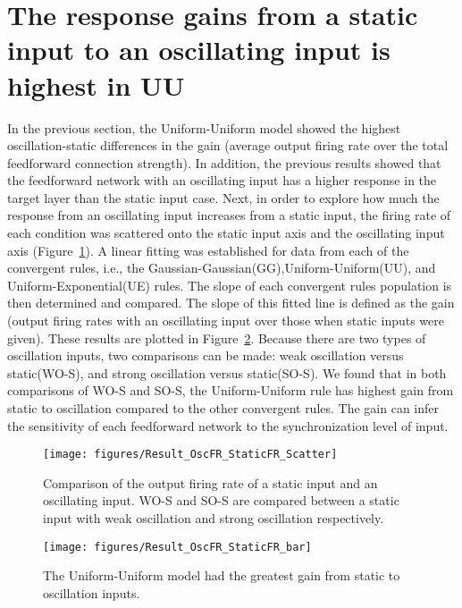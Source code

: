 \section[Gain of Response by Input Types]{The response gains from a static input to an oscillating input is highest in UU}
 In the previous section, the Uniform-Uniform model showed the highest oscillation-static differences in the gain (average output firing rate over the total feedforward connection strength). In addition, the previous results showed that the feedforward network with an oscillating input has a higher response in the target layer than the static input case. 
Next, in order to explore how much the response from an oscillating input increases from a static input, the firing rate of each condition was scattered onto the static input axis and the oscillating input axis (Figure~\ref{fig:ResFunDiffOscS}). A linear fitting was established for data from each of the convergent rules, i.e., the Gaussian-Gaussian(GG),Uniform-Uniform(UU), and Uniform-Exponential(UE) rules. The slope of each convergent rules population is then determined and compared. The slope of this fitted line is defined as the gain (output firing rates with an oscillating input over those when static inputs were given). These results are plotted in Figure~\ref{fig:ResFunDiffOscS_hp}. Because there are two types of oscillation inputs, two comparisons can be made: weak oscillation versus static(WO-S), and strong oscillation versus static(SO-S). We found that in both comparisons of WO-S and SO-S, the Uniform-Uniform rule has highest gain from static to oscillation compared to the other convergent rules. The gain can infer the sensitivity of each feedforward network to the synchronization level of input. 



\begin{figure}[!h]
	\centering
	\texttt{[image: figures/Result\_OscFR\_StaticFR\_Scatter]}
	\caption[Comparison of the output firing rate]{Comparison of the output firing rate of a static input and an oscillating input. WO-S and SO-S are compared between a static input with weak oscillation and strong oscillation respectively.}
	\label{fig:ResFunDiffOscS}
\end{figure}


\begin{figure}[!h]
	\centering
	\texttt{[image: figures/Result\_OscFR\_StaticFR\_bar]}
	\caption[The Gain from static to oscillation inputs]{The Uniform-Uniform model had the greatest gain from static to oscillation inputs.}
	\label{fig:ResFunDiffOscS_hp}
\end{figure}

